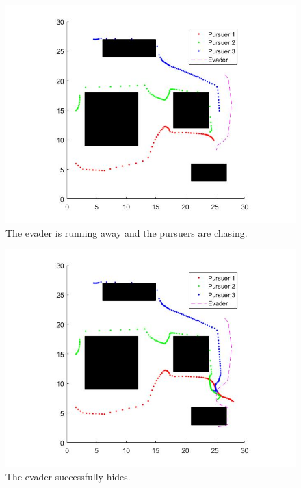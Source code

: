 \documentclass[ebook,11pt] {kth-mag}
\begin{document}
\begin{figure}[H]
\includegraphics[scale=0.4]{close_third_chase}
\centering
\caption{The evader is running away and the pursuers are chasing.}
\end{figure}

\begin{figure}[H]
\includegraphics[scale=0.4]{close_fourth_hide}
\centering
\caption{The evader successfully hides.}
\end{figure}
\end{document}
